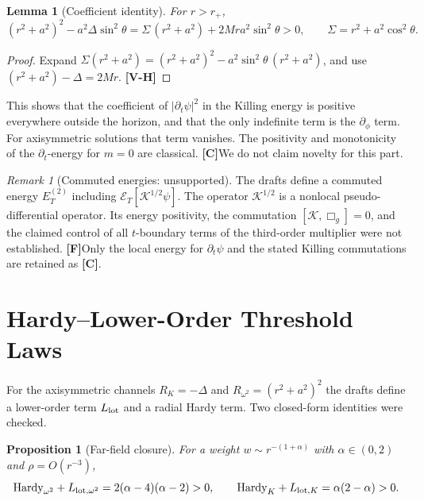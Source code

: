 \documentclass[11pt, a4paper]{article}
\newcommand{\VH}{\textcolor{vh}{\textbf{[V-H]}}}
\newcommand{\CC}{\textcolor{cc}{\textbf{[C]}}}
\newcommand{\FF}{\textcolor{ff}{\textbf{[F]}}}
\newtheorem{proposition}[theorem]{Proposition}
\newtheorem{lemma}[theorem]{Lemma}
\theoremstyle{remark}
\newtheorem{remark}[theorem]{Remark}
\theoremstyle{definition}
\begin{document}
\begin{lemma}[Coefficient identity]
\label{lem:energy}
For $r>r_+$,
\[
(r^2+a^2)^2 - a^2\Delta\sin^2\theta = \Sigma\,(r^2+a^2) + 2Mra^2\sin^2\theta > 0, \qquad \Sigma = r^2 + a^2\cos^2\theta.
\]
\end{lemma}

\begin{proof}
Expand $\Sigma(r^2+a^2) = (r^2+a^2)^2 - a^2\sin^2\theta\,(r^2+a^2)$, and use $(r^2+a^2) - \Delta = 2Mr$. \VH
\end{proof}

This shows that the coefficient of $|\partial_t\psi|^2$ in the Killing energy is positive everywhere outside the horizon, and that the only indefinite term is the $\partial_\phi$ term. For axisymmetric solutions that term vanishes. The positivity and monotonicity of the $\partial_t$-energy for $m=0$ are classical. \CC We do not claim novelty for this part.

\begin{remark}[Commuted energies: unsupported]
The drafts define a commuted energy $E^{(2)}_T$ including $\mathcal{E}_T[\mathcal{K}^{1/2}\psi]$. The operator $\mathcal{K}^{1/2}$ is a nonlocal pseudo-differential operator. Its energy positivity, the commutation $[\mathcal{K},\Box_g] = 0$, and the claimed control of all $t$-boundary terms of the third-order multiplier were not established. \FF Only the local energy for $\partial_t\psi$ and the stated Killing commutations are retained as \CC.
\end{remark}

\section{Hardy--Lower-Order Threshold Laws}
\label{sec:hardy}

For the axisymmetric channels $R_K = -\Delta$ and $R_{\omega^2} = (r^2+a^2)^2$ the drafts define a lower-order term $L_{\rm lot}$ and a radial Hardy term. Two closed-form identities were checked.

\begin{proposition}[Far-field closure]
\label{prop:far}
For a weight $w \sim r^{-(1+\alpha)}$ with $\alpha\in(0,2)$ and $\rho = O(r^{-3})$,
\[
\mathrm{Hardy}_{\omega^2} + L_{{\rm lot},\omega^2} = 2(\alpha-4)(\alpha-2) > 0, \qquad \mathrm{Hardy}_K + L_{{\rm lot},K} = \alpha(2-\alpha) > 0.
\]
\end{proposition}
\end{document}
